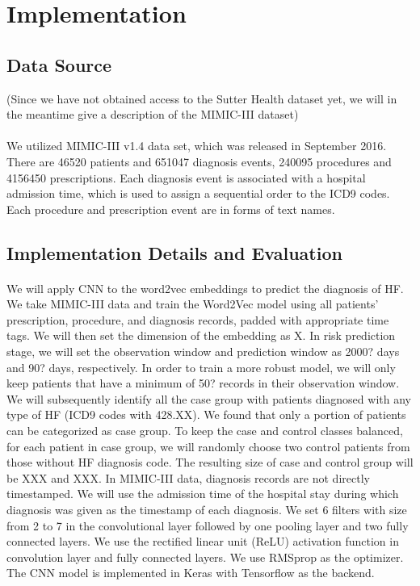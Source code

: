 \documentclass[11pt]{article}
\begin{document}
	
	\section{Implementation}
	\label{sec:exp}
	
	\subsection{Data Source}
	
	(Since we have not obtained access to the Sutter Health dataset yet, we will in the meantime give a description of the MIMIC-III dataset)
	
	\paragraph{}We utilized MIMIC-III v1.4 data set, which was released in September 2016.  There are 46520 patients and 651047 diagnosis events, 240095 procedures and 4156450 prescriptions. Each diagnosis event is associated with a hospital admission time, which is used to assign a sequential order to the ICD9 codes. Each procedure and prescription event are in forms of text names. 
	
	
	
	\subsection{Implementation Details and Evaluation}
	
	\paragraph{}We will apply CNN to the word2vec embeddings to predict the diagnosis of HF. We take MIMIC-III data and train the Word2Vec model using all patients’ prescription, procedure, and diagnosis records, padded with appropriate time tags. We will then set the dimension of the embedding as X. In risk prediction stage, we will set the observation window and prediction window as 2000? days and 90? days, respectively. In order to train a more robust model, we will only keep patients that have a minimum of 50? records in their observation window. We will subsequently identify all the case group with patients diagnosed with any type of HF (ICD9 codes with 428.XX). We found that only a portion of patients can be categorized as case group. To keep the case and control classes balanced, for each patient in case group, we will randomly choose two control patients from those without HF diagnosis code. The resulting size of case and control group will be XXX and XXX. In MIMIC-III data, diagnosis records are not directly timestamped. We will use the admission time of the hospital stay during which diagnosis was given as the timestamp of each diagnosis. We set 6 filters with size from 2 to 7 in the convolutional layer followed by one pooling layer and two fully connected layers. We use the rectified linear unit (ReLU) activation function in convolution layer and fully connected layers. We use RMSprop as the optimizer. The CNN model is implemented in Keras with Tensorflow as the backend.
	
\end{document}
